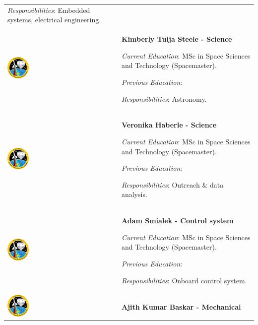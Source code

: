 \begin{longtable}[]{m{} m{}}
\smallskip
\textit{Responsibilities}: Embedded systems, electrical engineering.
\bigskip
\\
 \includegraphics[width=0.2\textwidth]{0-cover/img/logo-rexus-bexus.png}  & \textbf{Kimberly Tuija Steele - Science}

\smallskip
\textit{Current Education}: MSc in Space Sciences and Technology (Spacemaster).

\smallskip
\textit{Previous Education}:

\smallskip
\textit{Responsibilities}: Astronomy.
\bigskip
\\
 \includegraphics[width=0.2\textwidth]{0-cover/img/logo-rexus-bexus.png}  & \textbf{Veronika Haberle - Science}

\smallskip
\textit{Current Education}: MSc in Space Sciences and Technology (Spacemaster).

\smallskip
\textit{Previous Education}:

\smallskip
\textit{Responsibilities}: Outreach \& data analysis.
\bigskip
\\
 \includegraphics[width=0.2\textwidth]{0-cover/img/logo-rexus-bexus.png}  & \textbf{Adam Smialek - Control system}

\smallskip
\textit{Current Education}: MSc in Space Sciences and Technology (Spacemaster).

\smallskip
\textit{Previous Education}:

\smallskip
\textit{Responsibilities}: Onboard control system.
\bigskip
\\
 \includegraphics[width=0.2\textwidth]{0-cover/img/logo-rexus-bexus.png}  & \textbf{Ajith Kumar Baskar - Mechanical}


\end{longtable}
